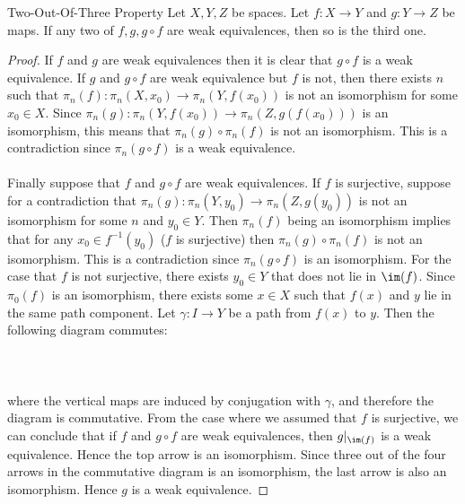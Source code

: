 \documentclass[a4paper]{article}
\begin{document}
\begin{prp}{Two-Out-Of-Three Property}{} Let $X,Y,Z$ be spaces. Let $f:X\to Y$ and $g:Y\to Z$ be maps. If any two of $f,g,g\circ f$ are weak equivalences, then so is the third one. \tcbline
\begin{proof}
If $f$ and $g$ are weak equivalences then it is clear that $g\circ f$ is a weak equivalence. If $g$ and $g\circ f$ are weak equivalence but $f$ is not, then there exists $n$ such that $\pi_n(f):\pi_n(X,x_0)\to\pi_n(Y,f(x_0))$ is not an isomorphism for some $x_0\in X$. Since $\pi_n(g):\pi_n(Y,f(x_0))\to\pi_n(Z,g(f(x_0)))$ is an isomorphism, this means that $\pi_n(g)\circ\pi_n(f)$ is not an isomorphism. This is a contradiction since $\pi_n(g\circ f)$ is a weak equivalence. \\~\\

Finally suppose that $f$ and $g\circ f$ are weak equivalences. If $f$ is surjective, suppose for a contradiction that $\pi_n(g):\pi_n(Y,y_0)\to\pi_n(Z,g(y_0))$ is not an isomorphism for some $n$ and $y_0\in Y$. Then $\pi_n(f)$ being an isomorphism implies that for any $x_0\in f^{-1}(y_0)$ ($f$ is surjective) then $\pi_n(g)\circ\pi_n(f)$ is not an isomorphism. This is a contradiction since $\pi_n(g\circ f)$ is an isomorphism. For the case that $f$ is not surjective, there exists $y_0\in Y$ that does not lie in $\im(f)$. Since $\pi_0(f)$ is an isomorphism, there exists some $x\in X$ such that $f(x)$ and $y$ lie in the same path component. Let $\gamma:I\to Y$ be a path from $f(x)$ to $y$. Then the following diagram commutes: \\~\\
\\~\\
where the vertical maps are induced by conjugation with $\gamma$, and therefore the diagram is commutative. From the case where we assumed that $f$ is surjective, we can conclude that if $f$ and $g\circ f$ are weak equivalences, then $g|_{\im(f)}$ is a weak equivalence. Hence the top arrow is an isomorphism. Since three out of the four arrows in the commutative diagram is an isomorphism, the last arrow is also an isomorphism. Hence $g$ is a weak equivalence. 
\end{proof}
\end{prp}
\end{document}
